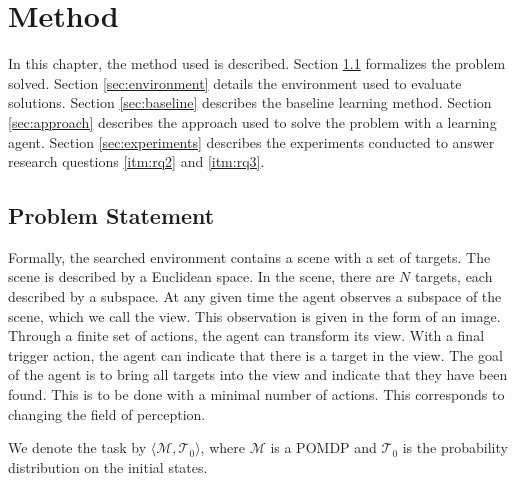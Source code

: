 \chapter{Method}
\label{cha:method}


% 

In this chapter, the method used is described.
Section \ref{sec:problem} formalizes the problem solved.
Section \ref{sec:environment} details the environment used to evaluate solutions.
Section \ref{sec:baseline} describes the baseline learning method.
Section \ref{sec:approach} describes the approach used to solve the problem with a learning agent.
Section \ref{sec:experiments} describes the experiments conducted to answer research questions \ref{itm:rq2} and \ref{itm:rq3}.

\section{Problem Statement}
\label{sec:problem}

Formally, the searched environment contains a scene with a set of targets.
The scene is described by a Euclidean space.
In the scene, there are \(N\) targets, each described by a subspace.
At any given time the agent observes a subspace of the scene, which we call the view.
This observation is given in the form of an image.
Through a finite set of actions, the agent can transform its view.
With a final trigger action, the agent can indicate that there is a target in the view.
The goal of the agent is to bring all targets into the view and indicate that they have been found.
This is to be done with a minimal number of actions.
This corresponds to changing the field of perception.

We denote the task by \(\langle \mathcal{M}, \mathcal{T}_0 \rangle\), where \(\mathcal{M}\) is a POMDP and \(\mathcal{T}_0\) is the probability distribution on the initial states.

